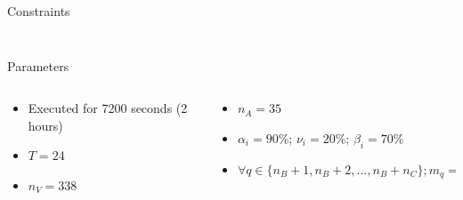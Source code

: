 \documentclass[aspectratio=169]{beamer}
\begin{document}
\begin{frame}[label={sec:org87b0b76}]{Constraints}
\begin{columns}
\begin{column}{0.6\columnwidth}
\begin{figure}
{
      }
      \label{fig:spacial-and-temporal-constr}
\end{figure}
\end{column}
\end{columns}
\end{frame}

\begin{frame}[label={sec:orgdd82b91}]{Parameters}
\begin{columns}
\begin{column}{0.5\columnwidth}
\begin{itemize}
\item Executed for 7200 seconds (2 hours)
\item \(T = 24\)
\item \(n_V = 338\)
\end{itemize}
\end{column}

\begin{column}{0.5\columnwidth}
\begin{itemize}
\item \(n_A = 35\)
\item \(\alpha_i = 90\%\);  \(\nu_i = 20\%\);  \(\beta_i = 70\%\)
\item \(\forall q \in \{n_B + 1, n_B + 2,..., n_B + n_C \}; m_q = 1000q\)
\end{itemize}
\end{column}
\end{columns}
\end{frame}
\end{document}
